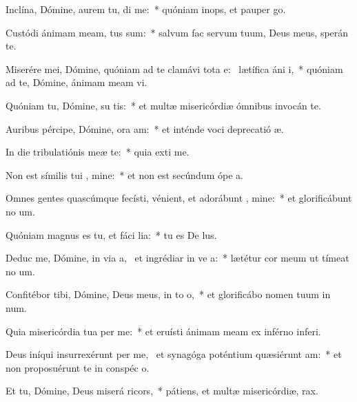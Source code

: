 \item Inclína, Dómine, aurem tu,  di me:~* quóniam inops, et pauper  go.
\item Custódi ánimam meam,  tus sum:~* salvum fac servum tuum, Deus meus, sperán  te.
\item Miserére mei, Dómine, quóniam ad te clamávi tota e:~\pscross{} lætífica áni  i,~* quóniam ad te, Dómine, ánimam meam vi.
\item Quóniam tu, Dómine, su  tis:~* et multæ misericórdiæ ómnibus invocán te.
\item Auribus pércipe, Dómine, ora am:~* et inténde voci deprecatió æ.
\item In die tribulatiónis meæ   te:~* quia exti me.
\item Non est símilis tui  , mine:~* et non est secúndum ópe a.
\item Omnes gentes quascúmque fecísti, vénient, et adorábunt  , mine:~* et glorificábunt no um.
\item Quóniam magnus es tu, et fáci lia:~* tu es De lus.
\item Deduc me, Dómine, in via a,~\pscross{} et ingrédiar in ve a:~* lætétur cor meum ut tímeat no um.
\item Confitébor tibi, Dómine, Deus meus, in to  o,~* et glorificábo nomen tuum in num.
\item Quia misericórdia tua   per me:~* et eruísti ánimam meam ex inférno inferi.
\item Deus iníqui insurrexérunt per me,~\pscross{} et synagóga poténtium quæsiérunt  am:~* et non proposuérunt te in conspéc o.
\item Et tu, Dómine, Deus miserá  ricors,~* pátiens, et multæ misericórdiæ,  rax.
